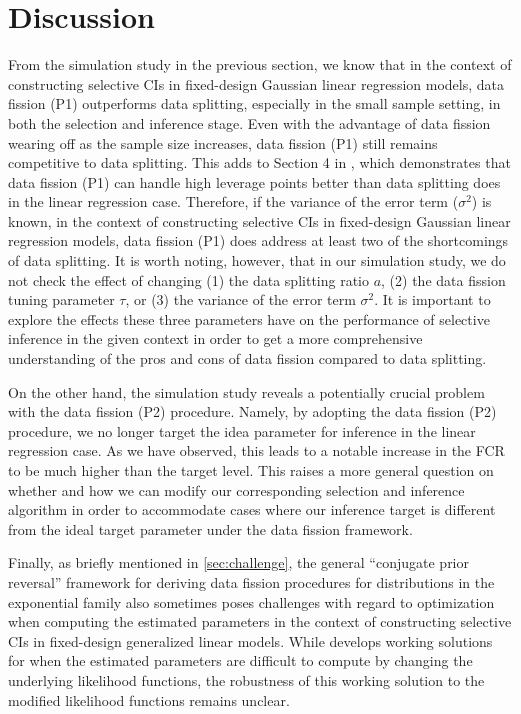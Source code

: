 \section{Discussion}
From the simulation study in the previous section, we know that in the context of constructing selective CIs in fixed-design Gaussian linear regression models, data fission (P1) outperforms data splitting, especially in the small sample setting, in both the selection and inference stage. Even with the advantage of data fission wearing off as the sample size increases, data fission (P1) still remains competitive to data splitting. This adds to Section 4 in \cite{leiner2022data}, which demonstrates that data fission (P1) can handle high leverage points better than data splitting does in the linear regression case. Therefore, if the variance of the error term ($\sigma^2$) is known, in the context of constructing selective CIs in fixed-design Gaussian linear regression models, data fission (P1) does address at least two of the shortcomings of data splitting. It is worth noting, however, that in our simulation study, we do not check the effect of changing (1) the data splitting ratio $a$, (2) the data fission tuning parameter $\tau$, or (3) the variance of the error term $\sigma^2$. It is important to explore the effects these three parameters have on the performance of selective inference in the given context in order to get a more comprehensive understanding of the pros and cons of data fission compared to data splitting.

On the other hand, the simulation study reveals a potentially crucial problem with the data fission (P2) procedure. Namely, by adopting the data fission (P2) procedure, we no longer target the idea parameter for inference in the linear regression case. As we have observed, this leads to a notable increase in the FCR to be much higher than the target level. This raises a more general question on whether and how we can modify our corresponding selection and inference algorithm in order to accommodate cases where our inference target is different from the ideal target parameter under the data fission framework.

Finally, as briefly mentioned in \cref{sec:challenge}, the general ``conjugate prior reversal'' framework for deriving data fission procedures for distributions in the exponential family also sometimes poses challenges with regard to optimization when computing the estimated parameters in the context of constructing selective CIs in fixed-design generalized linear models. While \cite{leiner2022data} develops working solutions for when the estimated parameters are difficult to compute by changing the underlying likelihood functions, the robustness of this working solution to the modified likelihood functions remains unclear.

